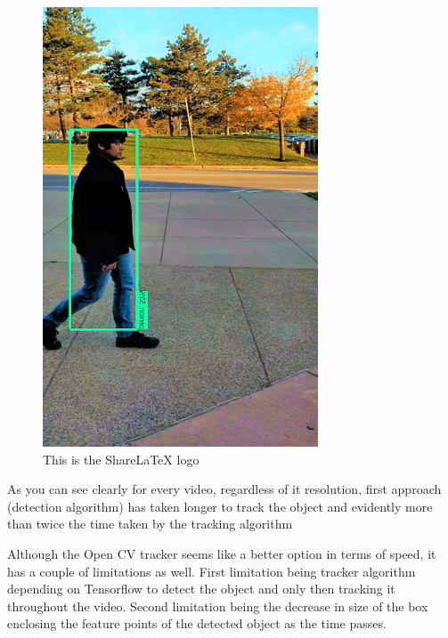 \documentclass[10pt,twocolumn,letterpaper]{article}
\begin{document}
\begin{figure}
\includegraphics[width=\linewidth]{./Picture2.png}
\caption{This is the Share\LaTeX{} logo}
\end{figure}

As you can see clearly for every video, regardless of it resolution, first approach (detection algorithm) has taken longer to track the object and evidently more than twice the time taken by the tracking algorithm



Although the Open CV tracker seems like a better option in terms of speed, it has a couple of limitations as well. First limitation being tracker algorithm depending on Tensorflow to detect the object and only then tracking it throughout the video. Second limitation being the decrease in size of the box enclosing the feature points of the detected object as the time passes.
\end{document}
